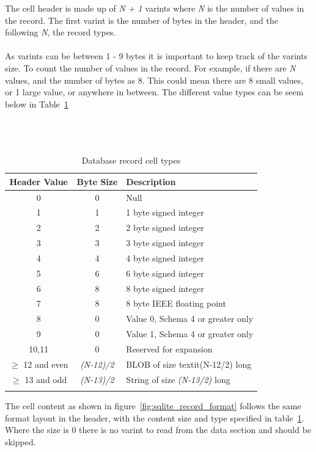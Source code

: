 The cell header is made up of \textit{N + 1} varints where \textit{N} is the number of values in the record. The first varint is the number of bytes in the header, and the following \textit{N}, the record types.
\\\\
As varints can be between 1 - 9 bytes it is important to keep track of the varints size. To count the number of values in the record. For example, if there are \textit{N} values, and the number of bytes as 8. This could mean there are 8 small values, or 1 large value, or anywhere in between. The different value types can be seem below in Table~\ref{tbl:cell_header_record_types} 
\\\\\\\\
\begin{longtable}[h]{| c | c| p{5cm} |}
		\hline
			\textbf{Header Value} & \textbf{Byte Size} & \textbf{Description} \\ 
		\hline
		\endhead
			0 & 0 & Null \\
		\hline
			1 & 1 & 1 byte signed integer \\
		\hline
			2 & 2 & 2 byte signed integer \\
		\hline
			3 & 3 & 3 byte signed integer \\
		\hline
			4 & 4 & 4 byte signed integer \\
		\hline
			5 & 6 & 6 byte signed integer \\
		\hline
			6 & 8 & 8 byte signed integer \\
		\hline
			7 & 8 & 8 byte IEEE floating point \\
		\hline
			8 & 0 & Value 0, Schema 4 or greater only \\
		\hline
			9 & 0 & Value 1, Schema 4 or greater only \\
		\hline
			10,11 & 0 & Reserved for expansion \\
		\hline
			$\geq$ 12 and even & \textit{(N-12)/2} & BLOB of size textit{(N-12/2)} long \\
		\hline
			$\geq$ 13 and odd & \textit{(N-13)/2} & String of size \textit{(N-13/2)} long \\
		\hline
	\caption{Database record cell types}
	\label{tbl:cell_header_record_types}
\end{longtable}

The cell content as shown in figure~\ref{fig:sqlite_record_format} follows the same format layout in the header, with the content size and type specified in table~\ref{tbl:cell_header_record_types}. Where the size is 0 there is no varint to read from the data section and should be skipped.

